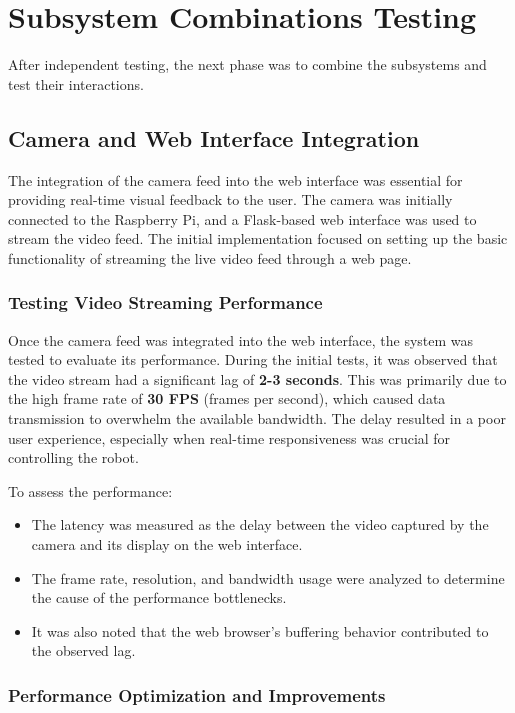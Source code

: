 \section{Subsystem Combinations Testing}

After independent testing, the next phase was to combine the subsystems and test their interactions.

\subsection{Camera and Web Interface Integration}

The integration of the camera feed into the web interface was essential for providing real-time visual feedback to the user. The camera was initially connected to the Raspberry Pi, and a Flask-based web interface was used to stream the video feed. The initial implementation focused on setting up the basic functionality of streaming the live video feed through a web page.

\subsubsection{Testing Video Streaming Performance}

Once the camera feed was integrated into the web interface, the system was tested to evaluate its performance. During the initial tests, it was observed that the video stream had a significant lag of \textbf{2-3 seconds}. This was primarily due to the high frame rate of \textbf{30 FPS} (frames per second), which caused data transmission to overwhelm the available bandwidth. The delay resulted in a poor user experience, especially when real-time responsiveness was crucial for controlling the robot.

To assess the performance:
\begin{itemize}
	\item The latency was measured as the delay between the video captured by the camera and its display on the web interface.
	\item The frame rate, resolution, and bandwidth usage were analyzed to determine the cause of the performance bottlenecks.
	\item It was also noted that the web browser’s buffering behavior contributed to the observed lag.
\end{itemize}

\subsubsection{Performance Optimization and Improvements}

